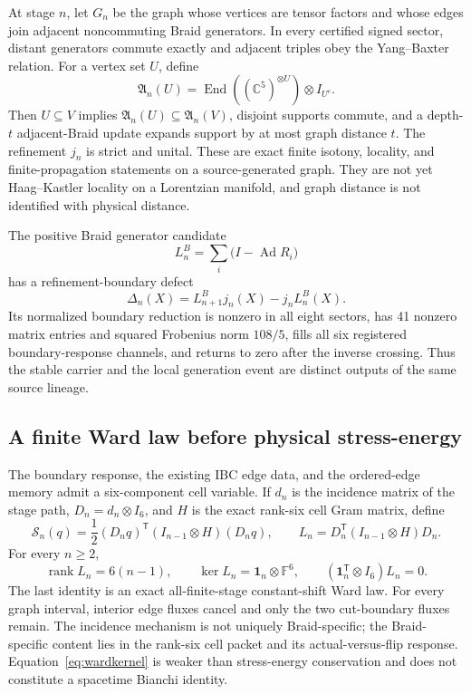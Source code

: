\documentclass[11pt]{article}
\theoremstyle{definition}
\theoremstyle{remark}
\newcommand{\Ad}{\operatorname{Ad}}
\newcommand{\rank}{\operatorname{rank}}
\begin{document}
At stage $n$, let $G_n$ be the graph whose vertices are tensor factors and whose edges join adjacent noncommuting Braid generators. In every certified signed sector, distant generators commute exactly and adjacent triples obey the Yang--Baxter relation. For a vertex set $U$, define
\begin{equation}\label{eq:localnet}
 \mathfrak A_n(U)=\operatorname{End}\!\left((\mathbb C^5)^{\otimes U}\right)\otimes I_{U^c}.
\end{equation}
Then $U\subseteq V$ implies $\mathfrak A_n(U)\subseteq\mathfrak A_n(V)$, disjoint supports commute, and a depth-$t$ adjacent-Braid update expands support by at most graph distance $t$. The refinement $j_n$ is strict and unital. These are exact finite isotony, locality, and finite-propagation statements on a source-generated graph. They are not yet Haag--Kastler locality on a Lorentzian manifold, and graph distance is not identified with physical distance.

The positive Braid generator candidate
\begin{equation}\label{eq:braidgenerator}
 L_n^B=\sum_i\bigl(I-\Ad R_i\bigr)
\end{equation}
has a refinement-boundary defect
\begin{equation}\label{eq:boundarydefect}
 \Delta_n(X)=L_{n+1}^Bj_n(X)-j_nL_n^B(X).
\end{equation}
Its normalized boundary reduction is nonzero in all eight sectors, has 41 nonzero matrix entries and squared Frobenius norm $108/5$, fills all six registered boundary-response channels, and returns to zero after the inverse crossing. Thus the stable carrier and the local generation event are distinct outputs of the same source lineage.

\subsection{A finite Ward law before physical stress-energy}

The boundary response, the existing IBC edge data, and the ordered-edge memory admit a six-component cell variable. If $d_n$ is the incidence matrix of the stage path, $D_n=d_n\otimes I_6$, and $H$ is the exact rank-six cell Gram matrix, define
\begin{equation}\label{eq:wardaction}
 \mathcal S_n(q)=\frac12(D_nq)^{\mathsf T}(I_{n-1}\otimes H)(D_nq),
 \qquad
 L_n=D_n^{\mathsf T}(I_{n-1}\otimes H)D_n.
\end{equation}
For every $n\ge2$,
\begin{equation}\label{eq:wardkernel}
 \rank L_n=6(n-1),\qquad
 \ker L_n=\mathbf1_n\otimes\mathbb F^6,
 \qquad
 (\mathbf1_n^{\mathsf T}\otimes I_6)L_n=0.
\end{equation}
The last identity is an exact all-finite-stage constant-shift Ward law. For every graph interval, interior edge fluxes cancel and only the two cut-boundary fluxes remain. The incidence mechanism is not uniquely Braid-specific; the Braid-specific content lies in the rank-six cell packet and its actual-versus-flip response. Equation~\eqref{eq:wardkernel} is weaker than stress-energy conservation and does not constitute a spacetime Bianchi identity.
\end{document}
